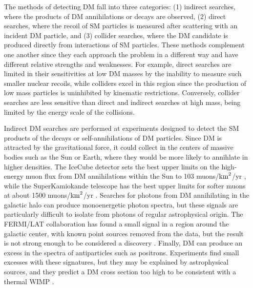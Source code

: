 The methods of detecting DM fall into three categories: (1) indirect searches, where the products of DM annihilations or decays are observed, (2) direct searches, where the recoil of SM particles is measured after scattering with an incident DM particle, and (3) collider searches, where the DM candidate is produced directly from interactions of SM particles. These methods complement one another since they each approach the problem in a different way and have different relative strengths and weaknesses. For example, direct searches are limited in their sensitivities at low DM masses by the inability to measure such smaller nuclear recoils, while colliders excel in this region since the production of low mass particles is uninhibited by kinematic restrictions. Conversely, collider searches are less sensitive than direct and indirect searches at high mass, being limited by the energy scale of the collisions.

\indent Indirect DM searches are performed at experiments designed to detect the SM products of the decays or self-annihilations of DM particles. Since DM is attracted by the gravitational force, it could collect in the centers of massive bodies such as the Sun or Earth, where they would be more likely to annihlate in higher densities. The IceCube detector sets the best upper limits on the high-energy muon flux from DM annihilations within the Sun to 103 muons/$\rm{km}^2$/yr \cite{PhysRevLett.110.131302}, while the SuperKamiokande telescope has the best upper limits for softer muons at about 1500 muons/$\rm{km}^2$/yr \cite{0004-637X-742-2-78}. Searches for photons from DM annihilating in the galactic halo can produce monoenergetic photon spectra, but these signals are particularly difficult to isolate from photons of regular astrophysical origin. The FERMI/LAT collaboration has found a small signal in a region around the galactic center, with known point sources removed from the data, but the result is not strong enough to be considered a discovery \cite{Ackermann:2013uma}. Finally, DM can produce an excess in the spectra of antiparticles such as positrons. Experiments find small excesses with these signatures, but they may be explained by astrophysical sources, and they predict a DM cross section too high to be consistent with a thermal WIMP \cite{Agashe:2014kda}.

